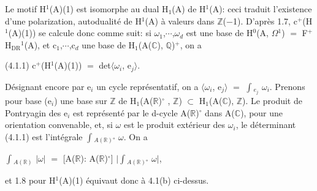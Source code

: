 \documentclass[10pt,twoside]{article}
\begin{document}
Le motif H\ensuremath{^{1}}(A)(1) est isomorphe au dual H\ensuremath{_{1}}(A) de H\ensuremath{^{1}}(A): ceci traduit l’existence d’une polarization, autodualité de H\ensuremath{^{1}}(A) à valeurs dans \ensuremath{ℤ}(\ensuremath{−}1). D’après 1.7, c\ensuremath{^{+}}(H\ensuremath{^{1}}(A)(1)) se calcule donc comme suit: si \ensuremath{ω}\ensuremath{_{1}},\ensuremath{⋯},\ensuremath{ω}\ensuremath{_{d}} est une base de H\ensuremath{^{0}}(A, \ensuremath{Ω}\ensuremath{^{1}}) \ensuremath{=} F\ensuremath{^{+}}H\ensuremath{_{\mathrm{DR}}}\ensuremath{^{1}}(A), et c\ensuremath{_{1}},\ensuremath{⋯},c\ensuremath{_{d}} une base de H\ensuremath{_{1}}(A(\ensuremath{ℂ}), \ensuremath{ℚ})\ensuremath{^{+}}, on a\par
(4.1.1)    c\ensuremath{^{+}}(H\ensuremath{^{1}}(A)(1)) \ensuremath{=} det\ensuremath{⟨}\ensuremath{ω}\ensuremath{_{i}}, e\ensuremath{_{j}}\ensuremath{⟩}.\par
Désignant encore par e\ensuremath{_{i}} un cycle représentatif, on a \ensuremath{⟨}\ensuremath{ω}\ensuremath{_{i}}, e\ensuremath{_{j}}\ensuremath{⟩} \ensuremath{=} \ensuremath{∫}\ensuremath{_{e_j}} \ensuremath{ω}\ensuremath{_{i}}. Prenons pour base (e\ensuremath{_{i}}) une base sur \ensuremath{ℤ} de H\ensuremath{_{1}}(A(\ensuremath{ℝ})\ensuremath{^{\circ}} , \ensuremath{ℤ}) \ensuremath{⊂} H\ensuremath{_{1}}(A(\ensuremath{ℂ}), \ensuremath{ℤ}). Le produit de Pontryagin des e\ensuremath{_{i}} est représenté par le d-cycle A(\ensuremath{ℝ})\ensuremath{^{\circ}} dans A(\ensuremath{ℂ}), pour une orientation convenable, et, si \ensuremath{ω} est le produit extérieur des \ensuremath{ω}\ensuremath{_{i}}, le déterminant (4.1.1) est l’intégrale \ensuremath{∫}\ensuremath{_{A(ℝ)°}} \ensuremath{ω}. On a\par
\ensuremath{∫}\ensuremath{_{A(ℝ)}} \ensuremath{|}\ensuremath{ω}\ensuremath{|} \ensuremath{=} [A(\ensuremath{ℝ}): A(\ensuremath{ℝ})\ensuremath{^{\circ}}] \ensuremath{|}\ensuremath{∫}\ensuremath{_{A(ℝ)°}} \ensuremath{ω}\ensuremath{|},\par
et 1.8 pour H\ensuremath{^{1}}(A)(1) équivaut donc à 4.1(b) ci-dessus.\par
\end{document}
